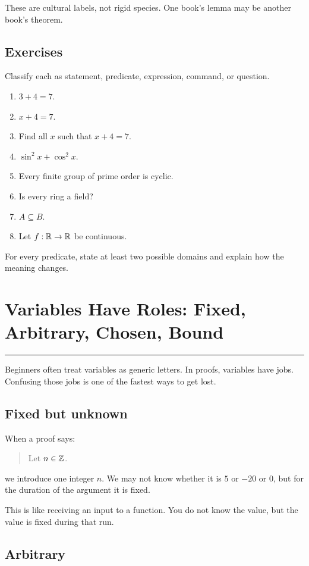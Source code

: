 \documentclass[12pt]{article}
\newcommand{\chapterline}{\vspace{0.4em}\hrule\vspace{0.8em}}
\begin{document}
These are cultural labels, not rigid species. One book's lemma may be another book's theorem.

\subsection{Exercises}

Classify each as statement, predicate, expression, command, or question.

\begin{enumerate}
\item $3+4=7$.
\item $x+4=7$.
\item Find all $x$ such that $x+4=7$.
\item $\sin^2 x+\cos^2 x$.
\item Every finite group of prime order is cyclic.
\item Is every ring a field?
\item $A\subseteq B$.
\item Let $f:\mathbb{R}\to\mathbb{R}$ be continuous.
\end{enumerate}

For every predicate, state at least two possible domains and explain how the meaning changes.

\newpage
\section{Variables Have Roles: Fixed, Arbitrary, Chosen, Bound}
\chapterline

Beginners often treat variables as generic letters. In proofs, variables have jobs. Confusing those jobs is one of the fastest ways to get lost.

\subsection{Fixed but unknown}

When a proof says:

\begin{quote}
Let $n\in\mathbb{Z}$.
\end{quote}

we introduce one integer $n$. We may not know whether it is $5$ or $-20$ or $0$, but for the duration of the argument it is fixed.

This is like receiving an input to a function. You do not know the value, but the value is fixed during that run.

\subsection{Arbitrary}
\end{document}
